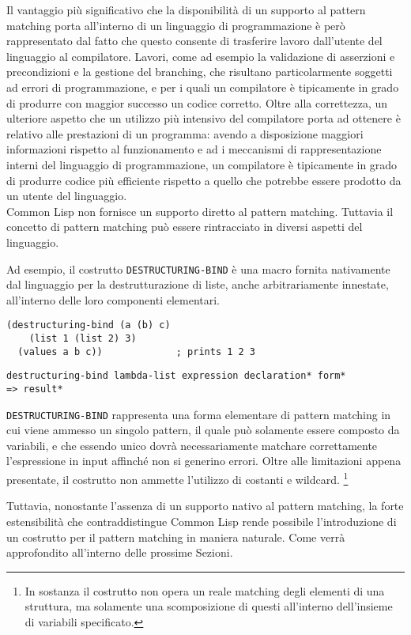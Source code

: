 Il vantaggio più significativo che la disponibilità di un supporto al pattern
matching porta all’interno di un linguaggio di programmazione è però
rappresentato dal fatto che questo consente di trasferire lavoro dall’utente
del linguaggio al compilatore. Lavori, come ad esempio la validazione di
asserzioni e precondizioni e la gestione del branching, che risultano
particolarmente soggetti ad errori di programmazione, e per i quali un
compilatore è tipicamente in grado di produrre con maggior successo un codice
corretto. Oltre alla correttezza, un ulteriore aspetto che un utilizzo più
intensivo del compilatore porta ad ottenere è relativo alle prestazioni di un
programma: avendo a disposizione maggiori informazioni rispetto al
funzionamento e ad i meccanismi di rappresentazione interni del linguaggio di
programmazione, un compilatore è tipicamente in grado di produrre codice più
efficiente rispetto a quello che potrebbe essere prodotto da un utente del
linguaggio.\\

Common Lisp non fornisce un supporto diretto al pattern matching.
Tuttavia il concetto di pattern matching può essere rintracciato in diversi
aspetti del linguaggio.

Ad esempio, il costrutto \texttt{DESTRUCTURING-BIND} è una macro fornita
nativamente dal linguaggio per la destrutturazione di liste, anche
arbitrariamente innestate, all’interno delle loro componenti elementari.

\begin{lstlisting}[caption=Esempio utilizzo della macro
  \texttt{DESTRUCTURING-BIND}.]
(destructuring-bind (a (b) c)
    (list 1 (list 2) 3)
  (values a b c))             ; prints 1 2 3
\end{lstlisting}

\begin{lstlisting}[caption=Signature della macro \texttt{DESTRUCTURING-BIND}.]
destructuring-bind lambda-list expression declaration* form*
=> result*
\end{lstlisting}

\texttt{DESTRUCTURING-BIND} rappresenta una forma elementare di pattern
matching in cui viene ammesso un singolo pattern, il quale può
solamente essere composto da variabili, e che essendo unico dovrà
necessariamente matchare correttamente l’espressione in input affinché non si
generino errori. Oltre alle limitazioni appena presentate, il costrutto non
ammette l'utilizzo di costanti e wildcard. \footnote{In sostanza il costrutto
non opera un reale matching degli elementi di una struttura, ma solamente una
scomposizione di questi all'interno dell'insieme di variabili specificato.}

Tuttavia, nonostante l'assenza di un supporto nativo al pattern matching, la
forte estensibilità che contraddistingue Common Lisp rende possibile
l'introduzione di un costrutto per il pattern matching in maniera naturale.
Come verrà approfondito all'interno delle prossime Sezioni.
